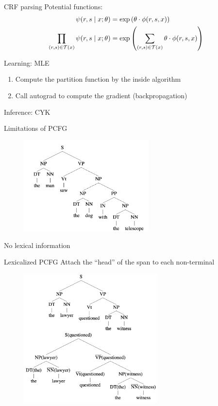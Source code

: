 \documentclass[usenames,dvipsnames,notes]{beamer}
\begin{document}
\begin{frame}
    {CRF parsing}
    Potential functions:
    \begin{align*}
        \psi(r, s\mid x; \theta) &= \exp\left( \theta\cdot\phi(r,s,x) \right)\\
        \prod_{(r,s)\in\mathcal{T}(x)}\psi(r, s\mid x; \theta) &= \exp\left( \sum_{(r,s)\in\mathcal{T}(x)}\theta\cdot\phi(r,s,x) \right)\\
    \end{align*}

    Learning: MLE\\
    \begin{enumerate}
        \item Compute the partition function by the inside algorithm
        \item Call autograd to compute the gradient (backpropagation)
    \end{enumerate}

    Inference: CYK
\end{frame}

\begin{frame}
    {Limitations of PCFG}
    \begin{figure}
        \includegraphics[height=5cm]{figures/parse-1}
    \end{figure}
    \pause
    No lexical information
\end{frame}

\begin{frame}
    {Lexicalized PCFG}
    Attach the ``head'' of the span to each non-terminal
    \begin{figure}
        \includegraphics[height=7cm]{figures/lex-pcfg}
    \end{figure}
\end{frame}
\end{document}
